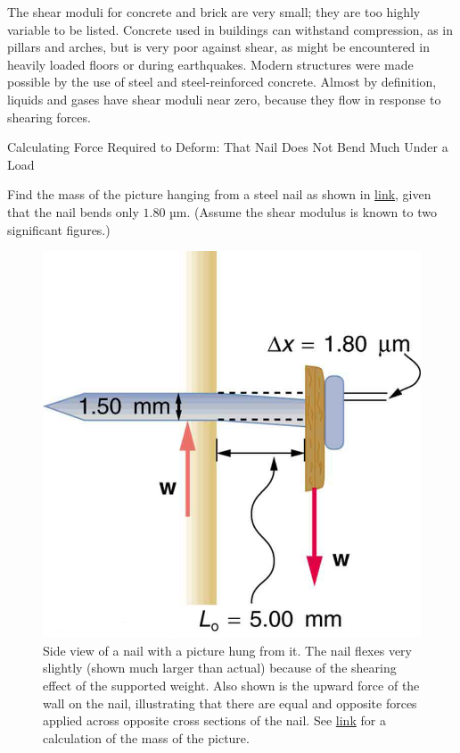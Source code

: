 \documentclass[
]{book}
\begin{document}
The shear moduli for concrete and brick are very small; they are too
highly variable to be listed. Concrete used in buildings can withstand
compression, as in pillars and arches, but is very poor against shear,
as might be encountered in heavily loaded floors or during earthquakes.
Modern structures were made possible by the use of steel and
steel-reinforced concrete. Almost by definition, liquids and gases have
shear moduli near zero, because they flow in response to shearing
forces.

\hypertarget{fs-id1165296288315}{}
Calculating Force Required to Deform: That Nail Does Not Bend Much Under
a Load

Find the mass of the picture hanging from a steel nail as shown in
\protect\hyperlink{import-auto-id1165298644588}{link}, given that
the nail bends only \(\text{1.80\ µm}{}\). (Assume the shear modulus is
known to two significant figures.)

\begin{figure}
\hypertarget{import-auto-id1165298644588}{%
\centering
\includegraphics{images/Figure_06_03_08a.jpg}
\caption{Side view of a nail with a picture hung from it. The nail flexes very
slightly (shown much larger than actual) because of the shearing effect
of the supported weight. Also shown is the upward force of the wall on
the nail, illustrating that there are equal and opposite forces applied
across opposite cross sections of the nail. See
\protect\hyperlink{fs-id1165296288315}{link} for a calculation of
the mass of the
picture.}\label{import-auto-id1165298644588}
}
\end{figure}
\end{document}
